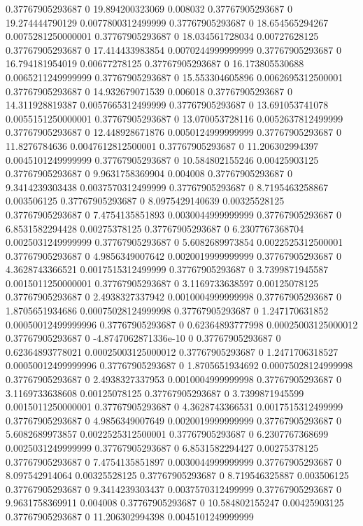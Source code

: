 0.37767905293687 0 19.894200323069 0.008032
0.37767905293687 0 19.274444790129 0.0077800312499999
0.37767905293687 0 18.654565294267 0.0075281250000001
0.37767905293687 0 18.034561728034 0.00727628125
0.37767905293687 0 17.414433983854 0.0070244999999999
0.37767905293687 0 16.794181954019 0.00677278125
0.37767905293687 0 16.173805530688 0.0065211249999999
0.37767905293687 0 15.553304605896 0.0062695312500001
0.37767905293687 0 14.932679071539 0.006018
0.37767905293687 0 14.311928819387 0.0057665312499999
0.37767905293687 0 13.691053741078 0.0055151250000001
0.37767905293687 0 13.070053728116 0.0052637812499999
0.37767905293687 0 12.448928671876 0.0050124999999999
0.37767905293687 0 11.8276784636 0.0047612812500001
0.37767905293687 0 11.206302994397 0.0045101249999999
0.37767905293687 0 10.584802155246 0.00425903125
0.37767905293687 0 9.9631758369904 0.004008
0.37767905293687 0 9.3414239303438 0.0037570312499999
0.37767905293687 0 8.7195463258867 0.003506125
0.37767905293687 0 8.0975429140639 0.00325528125
0.37767905293687 0 7.4754135851893 0.0030044999999999
0.37767905293687 0 6.8531582294428 0.00275378125
0.37767905293687 0 6.2307767368704 0.0025031249999999
0.37767905293687 0 5.6082689973854 0.0022525312500001
0.37767905293687 0 4.9856349007642 0.0020019999999999
0.37767905293687 0 4.3628743366521 0.0017515312499999
0.37767905293687 0 3.7399871945587 0.0015011250000001
0.37767905293687 0 3.1169733638597 0.00125078125
0.37767905293687 0 2.4938327337942 0.0010004999999998
0.37767905293687 0 1.8705651934686 0.00075028124999998
0.37767905293687 0 1.247170631852 0.00050012499999996
0.37767905293687 0 0.62364893777998 0.00025003125000012
0.37767905293687 0 -4.8747062871336e-10 0
0.37767905293687 0 0.62364893778021 0.00025003125000012
0.37767905293687 0 1.2471706318527 0.00050012499999996
0.37767905293687 0 1.8705651934692 0.00075028124999998
0.37767905293687 0 2.4938327337953 0.0010004999999998
0.37767905293687 0 3.1169733638608 0.00125078125
0.37767905293687 0 3.7399871945599 0.0015011250000001
0.37767905293687 0 4.3628743366531 0.0017515312499999
0.37767905293687 0 4.9856349007649 0.0020019999999999
0.37767905293687 0 5.6082689973857 0.0022525312500001
0.37767905293687 0 6.2307767368699 0.0025031249999999
0.37767905293687 0 6.8531582294427 0.00275378125
0.37767905293687 0 7.4754135851897 0.0030044999999999
0.37767905293687 0 8.097542914064 0.00325528125
0.37767905293687 0 8.719546325887 0.003506125
0.37767905293687 0 9.3414239303437 0.0037570312499999
0.37767905293687 0 9.9631758369911 0.004008
0.37767905293687 0 10.584802155247 0.00425903125
0.37767905293687 0 11.206302994398 0.0045101249999999
